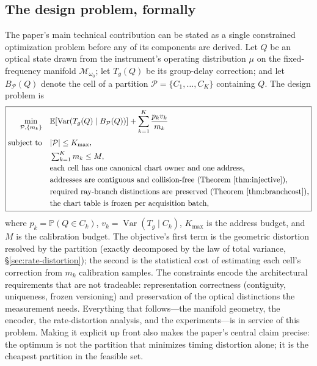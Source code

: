 \documentclass[11pt]{article}
\newcommand{\Mopt}{\mathcal{M}_{\omega_0}}
\begin{document}
\subsection{The design problem, formally}\label{sec:problem}

The paper's main technical contribution can be stated as a single constrained
optimization problem before any of its components are derived. Let $Q$ be an optical
state drawn from the instrument's operating distribution $\mu$ on the fixed-frequency
manifold $\Mopt$; let $T_g(Q)$ be its group-delay correction; and let
$B_{\mathcal{P}}(Q)$ denote the cell of a partition $\mathcal{P}=\{C_1,\ldots,C_K\}$
containing $Q$. The design problem is
\begin{equation}
\boxed{
\begin{aligned}
\min_{\mathcal{P},\{m_k\}} \quad
& \mathbb{E}\!\left[\operatorname{Var}\!\left(T_g(Q)\mid B_{\mathcal{P}}(Q)\right)\right]
  + \sum_{k=1}^{K} \frac{p_k v_k}{m_k} \\[2pt]
\text{subject to}\quad
& |\mathcal{P}| \le K_{\max}, \\
& \textstyle\sum_{k=1}^{K} m_k \le M, \\
& \text{each cell has one canonical chart owner and one address,} \\
& \text{addresses are contiguous and collision-free (Theorem~\ref{thm:injective}),} \\
& \text{required ray-branch distinctions are preserved (Theorem~\ref{thm:branchcost}),} \\
& \text{the chart table is frozen per acquisition batch,}
\end{aligned}}
\end{equation}
where $p_k=\mathbb{P}(Q\in C_k)$, $v_k=\operatorname{Var}(T_g\mid C_k)$, $K_{\max}$ is
the address budget, and $M$ is the calibration budget. The objective's first term is
the geometric distortion resolved by the partition (exactly decomposed by the law of
total variance, \S\ref{sec:rate-distortion}); the second is the statistical cost of
estimating each cell's correction from $m_k$ calibration samples. The constraints
encode the architectural requirements that are not tradeable: representation
correctness (contiguity, uniqueness, frozen versioning) and preservation of the
optical distinctions the measurement needs. Everything that follows---the manifold
geometry, the encoder, the rate-distortion analysis, and the experiments---is in
service of this problem. Making it explicit up front also makes the paper's central
claim precise: the optimum is not the partition that minimizes timing distortion
alone; it is the cheapest partition in the feasible set.
\end{document}
